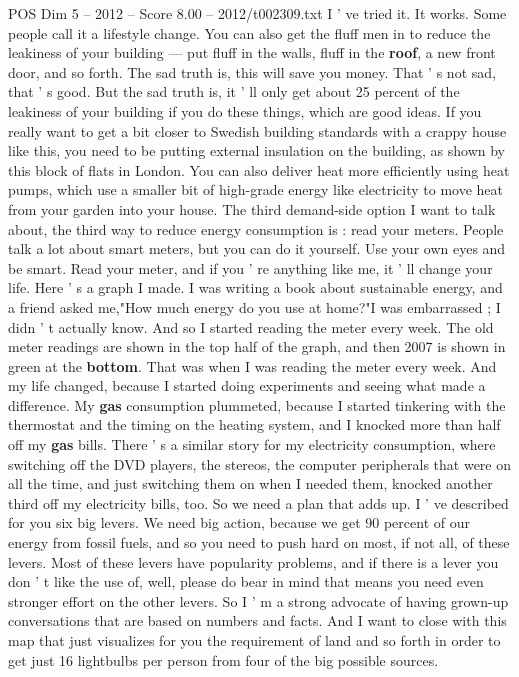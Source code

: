 \begin{textsample}{POS Dim 5 – 2012 – Score 8.00 – 2012/t002309.txt}
I ' ve tried it.
It works.
Some people call it a lifestyle change.
You can also get the fluff men in to reduce the leakiness of your building — put fluff in the walls, fluff in the \textbf{roof}, a new front door, and so forth.
The sad truth is, this will save you money.
That ' s not sad, that ' s good.
But the sad truth is, it ' ll only get about 25 percent of the leakiness of your building if you do these things, which are good ideas.
If you really want to get a bit closer to Swedish building standards with a crappy house like this, you need to be putting external insulation on the building, as shown by this block of flats in London.
You can also deliver heat more efficiently using heat pumps, which use a smaller bit of high-grade energy like electricity to move heat from your garden into your house.
The third demand-side option I want to talk about, the third way to reduce energy consumption is : read your meters.
People talk a lot about smart meters, but you can do it yourself.
Use your own eyes and be smart.
Read your meter, and if you ' re anything like me, it ' ll change your life.
Here ' s a graph I made.
I was writing a book about sustainable energy, and a friend asked me,"How much energy do you use at home?"I was embarrassed ; I didn ' t actually know.
And so I started reading the meter every week.
The old meter readings are shown in the top half of the graph, and then 2007 is shown in green at the \textbf{bottom}.
That was when I was reading the meter every week.
And my life changed, because I started doing experiments and seeing what made a difference.
My \textbf{gas} consumption plummeted, because I started tinkering with the thermostat and the timing on the heating system, and I knocked more than half off my \textbf{gas} bills.
There ' s a similar story for my electricity consumption, where switching off the DVD players, the stereos, the computer peripherals that were on all the time, and just switching them on when I needed them, knocked another third off my electricity bills, too.
So we need a plan that adds up.
I ' ve described for you six big levers.
We need big action, because we get 90 percent of our energy from fossil fuels, and so you need to push hard on most, if not all, of these levers.
Most of these levers have popularity problems, and if there is a lever you don ' t like the use of, well, please do bear in mind that means you need even stronger effort on the other levers.
So I ' m a strong advocate of having grown-up conversations that are based on numbers and facts.
And I want to close with this map that just visualizes for you the requirement of land and so forth in order to get just 16 lightbulbs per person from four of the big possible sources.

\end{textsample}
